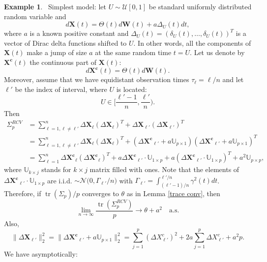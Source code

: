 \documentclass[a4paper,11pt]{book}
\theoremstyle{plain}
\theoremstyle{definition}
\newtheorem{exmp}[thm]{Example}
\newcommand{\tr}{\operatorname{tr}}
\begin{document}
    \begin{exmp} \label{uniform jumps} \
    		Simplest model: let $U \sim \mathcal{U}[0, 1]$ be standard uniformly distributed random variable and
    		\begin{equation}
    		d\mathbf{X}(t) = \Theta(t)  d\mathbf{W}(t) + a\Delta_U(t)dt,
    		\end{equation}
    		where $a$ is a known positive constant and $\Delta_U(t) = (\delta_U(t), \dots, \delta_U(t))^T$ is a vector of Dirac delta functions shifted to $U$. In other words, all the components of $\mathbf{X}(t)$ make a jump of size $a$ at the same random time $t = U$. Let us denote by $\mathbf{X^c}(t)$ the continuous part of $\mathbf{X}(t)$:
    		\[ d\mathbf{X^c}(t) = \Theta(t) d\mathbf{W}(t). \]
    		Moreover, assume that we have equidistant observation times $\tau_{\ell} = \ell / n$ and let $\ell'$ be the index of interval, where $U$ is located:
    		\[ U \in \bigg[\frac{\ell'-1}{n}, \frac{\ell'}{n}\bigg). \]
    		Then
    		\[ 
    		\begin{aligned}
    		\Sigma_p^{RCV} & = \sum_{\ell=1, \ell \neq \ell'}^{n}\Delta \mathbf{X}_\ell(\Delta \mathbf{X}_\ell)^T + \Delta \mathbf{X}_{\ell'}(\Delta \mathbf{X}_{\ell'})^T\\
    		& = \sum_{\ell=1, \ell \neq \ell'}^{n}\Delta \mathbf{X}_\ell(\Delta \mathbf{X}_\ell)^T + (\Delta \mathbf{X^c}_{\ell'} + a\mathbb{U}_{p \times 1})(\Delta \mathbf{X^c}_{\ell'} + a\mathbb{U}_{p \times 1})^T\\
    		& =  \sum_{\ell=1}^{n}\Delta \mathbf{X^c}_\ell(\Delta \mathbf{X^c}_\ell)^T + a\Delta \mathbf{X^c}_{\ell'} \cdot \mathbb{U}_{1 \times p} + a(\Delta \mathbf{X^c}_{\ell'} \cdot \mathbb{U}_{1 \times p})^T + a^2\mathbb{U}_{p \times p} ,
    		\end{aligned}
    		\]
    		where $\mathbb{U}_{k \times j}$ stands for $k \times j$ matrix filled with ones. Note that the elements of $\Delta \mathbf{X^c}_{\ell'} \cdot \mathbb{U}_{1 \times p}$ are i.i.d. $\sim \mathcal{N}\big(0, \Gamma_{\ell'}/n )$ with $\Gamma_{\ell'}=\int_{(\ell' - 1)/n}^{\ell' / n} \gamma^2(t) dt$. Therefore, if $\tr(\Sigma_p)/p$ converges to $\theta$ as in Lemma \ref{trace conv}, then
    		\[ \lim_{n \rightarrow \infty} \frac{\tr(\Sigma_p^{RCV})}{p} \rightarrow \theta + a^2 \quad \text{a.s.} \]
    		Also,
    		\[
    		\| \Delta \mathbf{X}_{\ell'} \|_2^2 = \| \Delta \mathbf{X^c}_{\ell'} + a\mathbb{U}_{p \times 1} \|_2^2  = \sum_{j=1}^{p} (\Delta X^c_{\ell'})^2 + 2a\sum_{j=1}^{p} \Delta X^c_{\ell'} + a^2p.
    		\]
    		We have asymptotically:

\end{exmp}
\end{document}
